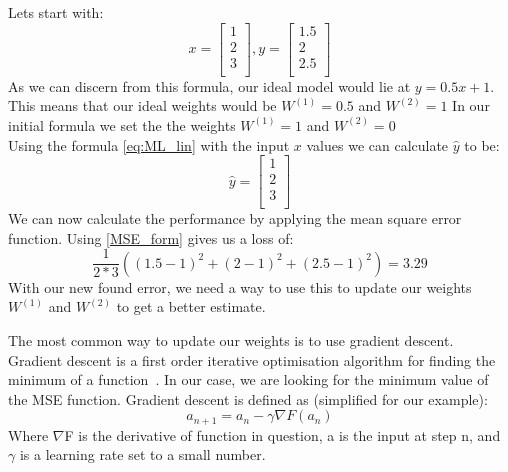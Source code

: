 \vspace{5px}
Lets start with: 
\begin{equation}
    x=\left[ \begin{array}{c} 1\\ 2\\ 3\\ \end{array} \right],
    y=\left[\begin{array}{c} 1.5\\2\\ 2.5\\\end{array}\right]
\end{equation}
As we can discern from this formula, our ideal model would lie at $y=0.5x + 1$. This means that our ideal weights would be  $W^{(1)}=0.5$ and $W^{(2)}=1$
In our initial formula we set the the weights $W^{(1)}=1$ and $W^{(2)}=0$\\
Using the formula \ref{eq:ML_lin} with the input $x$ values we can calculate  $\hat{y}$ to be:
\begin{equation}
    \hat{y}=\left[\begin{array}{c} 1\\ 2\\ 3\\ \end{array}\right]
\end{equation}
We can now calculate the performance by applying the mean square error function. Using \ref{MSE_form} gives us a loss of:
\begin{equation}
   \frac{1}{2*3} \left( {(1.5-1)}^2+{(2-1)}^2+{(2.5-1)}^2 \right) = 3.29
\end{equation}
With our new found error, we need a way to use this to update our weights $W^{(1)}$ and $W^{(2)}$ to get a better estimate. 
    

The most common way to update our weights is to use gradient descent. 
Gradient descent is a first order iterative optimisation algorithm for finding the minimum of a function~\cite{robbins1951}. In our case, we are looking for the minimum value of the MSE function. Gradient descent is defined as (simplified for our example):
\begin{equation}
    a_{n+1}= a_{n} - \gamma \nabla F(a_{n})
    \label{gradientdecent}
\end{equation}
Where $\nabla$F is the derivative of function in question, a is the input at step n, and $\gamma$ is a learning rate set to a small number. 

